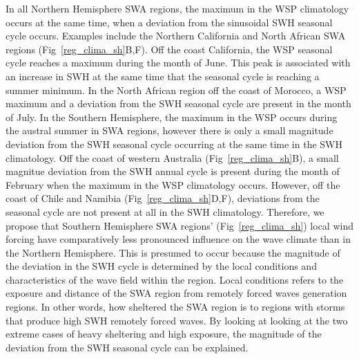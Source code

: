 \documentclass[12pt,twoside]{article}
\begin{document}
In all Northern Hemisphere SWA regions, the maximum in the WSP climatology occurs at the same time, when a deviation from the sinusoidal SWH seasonal cycle occurs. Examples include the Northern California and North African SWA regions (Fig~\ref{reg_clima_sh}B,F). Off the coast California, the WSP seasonal cycle reaches a maximum during the month of June. This peak is associated with an increase in SWH at the same time that the seasonal cycle is reaching a summer minimum. In the North African region off the coast of Morocco, a WSP maximum and a deviation from the SWH seasonal cycle are present in the month of July. In the Southern Hemisphere, the maximum in the WSP occurs during the austral summer in SWA regions, however there is only a small magnitude deviation from the SWH seasonal cycle occurring at the same time in the SWH climatology. Off the coast of western Australia (Fig~\ref{reg_clima_sh}B), a small magnitue deviation from the SWH annual cycle is present during the month of February when the maximum in the WSP climatology occurs. However, off the coast of Chile and Namibia (Fig~\ref{reg_clima_sh}D,F), deviations from the seasonal cycle are not present at all in the SWH climatology. Therefore, we propose that Southern Hemisphere SWA regions' (Fig~\ref{reg_clima_sh}) local wind forcing have comparatively less pronounced influence on the wave climate than in the Northern Hemisphere. This is presumed to occur because the magnitude of the deviation in the SWH cycle is determined by the local conditions and characteristics of the wave field within the region. Local conditions refers to the exposure and distance of the SWA region from remotely forced waves generation regions. In other words, how sheltered the SWA region is to regions with storms that produce high SWH remotely forced waves. By looking at looking at the two extreme cases of heavy sheltering and high exposure, the magnitude of the deviation from the SWH seasonal cycle can be explained. 
\end{document}
